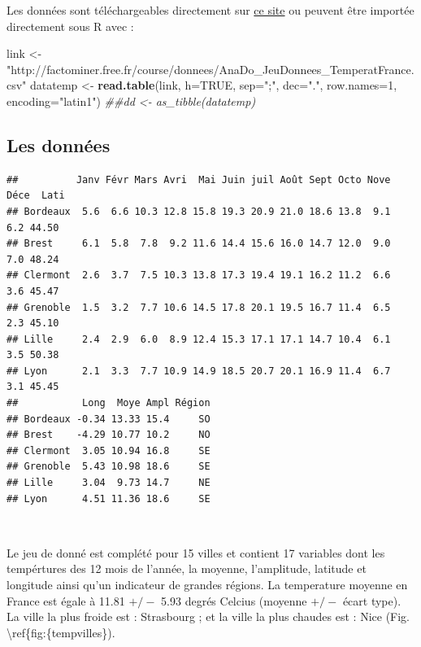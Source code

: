 \documentclass[
]{article}
\newenvironment{Shaded}{\begin{snugshade}}{\end{snugshade}}
\newcommand{\CommentTok}[1]{\textcolor[rgb]{0.56,0.35,0.01}{\textit{#1}}}
\newcommand{\DataTypeTok}[1]{\textcolor[rgb]{0.13,0.29,0.53}{#1}}
\newcommand{\DecValTok}[1]{\textcolor[rgb]{0.00,0.00,0.81}{#1}}
\newcommand{\KeywordTok}[1]{\textcolor[rgb]{0.13,0.29,0.53}{\textbf{#1}}}
\newcommand{\NormalTok}[1]{#1}
\newcommand{\OtherTok}[1]{\textcolor[rgb]{0.56,0.35,0.01}{#1}}
\newcommand{\StringTok}[1]{\textcolor[rgb]{0.31,0.60,0.02}{#1}}
\begin{document}
Les données sont téléchargeables directement sur
\href{https://husson.github.io/data.html}{ce site} ou peuvent être
importée directement sous R avec :

\begin{Shaded}
\begin{Highlighting}[]
\NormalTok{link <-}\StringTok{ "http://factominer.free.fr/course/donnees/AnaDo_JeuDonnees_TemperatFrance.csv"}
\NormalTok{datatemp <-}\StringTok{ }\KeywordTok{read.table}\NormalTok{(link, }\DataTypeTok{h=}\OtherTok{TRUE}\NormalTok{, }\DataTypeTok{sep=}\StringTok{";"}\NormalTok{, }\DataTypeTok{dec=}\StringTok{"."}\NormalTok{, }\DataTypeTok{row.names=}\DecValTok{1}\NormalTok{, }\DataTypeTok{encoding=}\StringTok{"latin1"}\NormalTok{)}
\CommentTok{##dd <- as_tibble(datatemp)}
\end{Highlighting}
\end{Shaded}

\hypertarget{les-donnuxe9es}{%
\subsection{\texorpdfstring{\textbf{Les
données}}{Les données}}\label{les-donnuxe9es}}

\begin{verbatim}
##          Janv Févr Mars Avri  Mai Juin juil Août Sept Octo Nove Déce  Lati
## Bordeaux  5.6  6.6 10.3 12.8 15.8 19.3 20.9 21.0 18.6 13.8  9.1  6.2 44.50
## Brest     6.1  5.8  7.8  9.2 11.6 14.4 15.6 16.0 14.7 12.0  9.0  7.0 48.24
## Clermont  2.6  3.7  7.5 10.3 13.8 17.3 19.4 19.1 16.2 11.2  6.6  3.6 45.47
## Grenoble  1.5  3.2  7.7 10.6 14.5 17.8 20.1 19.5 16.7 11.4  6.5  2.3 45.10
## Lille     2.4  2.9  6.0  8.9 12.4 15.3 17.1 17.1 14.7 10.4  6.1  3.5 50.38
## Lyon      2.1  3.3  7.7 10.9 14.9 18.5 20.7 20.1 16.9 11.4  6.7  3.1 45.45
##           Long  Moye Ampl Région
## Bordeaux -0.34 13.33 15.4     SO
## Brest    -4.29 10.77 10.2     NO
## Clermont  3.05 10.94 16.8     SE
## Grenoble  5.43 10.98 18.6     SE
## Lille     3.04  9.73 14.7     NE
## Lyon      4.51 11.36 18.6     SE
\end{verbatim}

~

Le jeu de donné est complété pour 15 villes et contient 17 variables
dont les tempértures des 12 mois de l'année, la moyenne, l'amplitude,
latitude et longitude ainsi qu'un indicateur de grandes régions. La
temperature moyenne en France est égale à 11.81 \(+/-\) 5.93 degrés
Celcius (moyenne \(+/-\) écart type). La ville la plus froide est :
Strasbourg ; et la ville la plus chaudes est : Nice (Fig.
\textbackslash ref\{fig:\{tempvilles\}).
\end{document}
